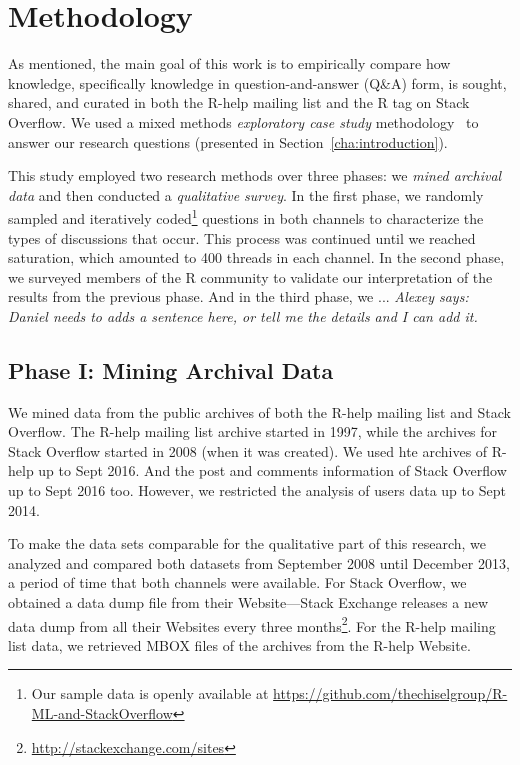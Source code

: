 \documentclass[smallextended]{svjour3}       %
\newcommand{\alexey}[1]{{\color{cyan}\emph{Alexey says: #1}}\xspace}
\newcommand{\alexey}[1]{}
\newcommand{\SO}{Stack Overflow\xspace}
\newcommand{\RH}{R-help\xspace}
\begin{document}
 \section{Methodology}
\label{cha:methodology}

As mentioned, the main goal of this work is to empirically compare how
knowledge, specifically knowledge in question-and-answer (Q\&A) form,
is sought, shared, and curated in both the \RH mailing list and the R
tag on \SO. We used a mixed methods \textit{exploratory case study}
methodology~\cite{Creswell2009,Runeson2012} to answer our research
questions (presented in Section~\ref{cha:introduction}).
                    
This study employed two research methods over three phases: we
\textit{mined archival data} and then conducted a \textit{qualitative
  survey}. In the first phase, we randomly sampled and iteratively
coded\footnote{Our sample data is openly available at
  \url{https://github.com/thechiselgroup/R-ML-and-StackOverflow}}
questions in both channels to characterize the types of discussions
that occur. This process was continued until we reached saturation,
which amounted to 400 threads in each channel. In the second phase, we
surveyed members of the R community to validate our interpretation of
the results from the previous phase. And in the third phase, we ... \alexey{Daniel needs to adds a sentence here, or tell me the details and I can add it.}

\subsection{Phase I: Mining Archival Data} 
\label{sec:studyDesign}

We mined data from the public archives of both the \RH mailing list and \SO. The \RH mailing list archive started in
1997, while the archives for \SO started in 2008 (when it was created). We used hte archives of \RH up to Sept 2016. And
the post and comments information of \SO up to Sept 2016 too. However, we restricted the analysis of users data up to
Sept 2014.

To make the
data sets comparable for the qualitative part of this research, we analyzed and compared both datasets from September 2008
until December 2013, a period of time that both channels were
available.  For \SO, we obtained a data dump file from their
Website---Stack Exchange releases a new data dump from all their
Websites every three
months\footnote{\url{http://stackexchange.com/sites}}. For the \RH
mailing list data, we retrieved MBOX files of the archives from the
\RH Website.
\end{document}
